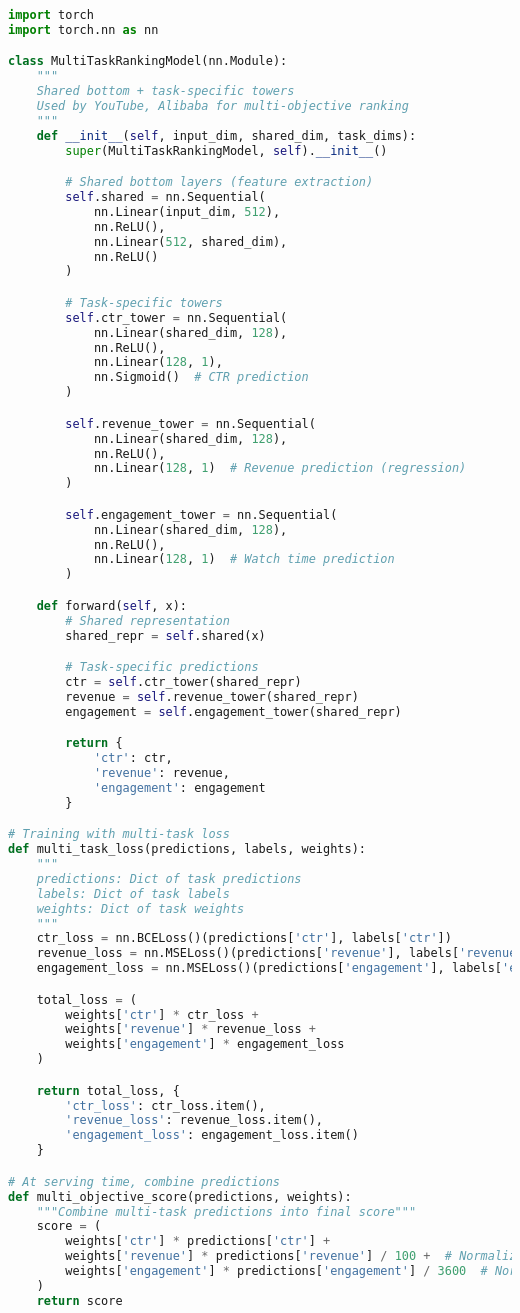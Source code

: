 \documentclass[10pt]{article}
\begin{document}
\begin{lstlisting}[language=Python]
import torch
import torch.nn as nn

class MultiTaskRankingModel(nn.Module):
    """
    Shared bottom + task-specific towers
    Used by YouTube, Alibaba for multi-objective ranking
    """
    def __init__(self, input_dim, shared_dim, task_dims):
        super(MultiTaskRankingModel, self).__init__()

        # Shared bottom layers (feature extraction)
        self.shared = nn.Sequential(
            nn.Linear(input_dim, 512),
            nn.ReLU(),
            nn.Linear(512, shared_dim),
            nn.ReLU()
        )

        # Task-specific towers
        self.ctr_tower = nn.Sequential(
            nn.Linear(shared_dim, 128),
            nn.ReLU(),
            nn.Linear(128, 1),
            nn.Sigmoid()  # CTR prediction
        )

        self.revenue_tower = nn.Sequential(
            nn.Linear(shared_dim, 128),
            nn.ReLU(),
            nn.Linear(128, 1)  # Revenue prediction (regression)
        )

        self.engagement_tower = nn.Sequential(
            nn.Linear(shared_dim, 128),
            nn.ReLU(),
            nn.Linear(128, 1)  # Watch time prediction
        )

    def forward(self, x):
        # Shared representation
        shared_repr = self.shared(x)

        # Task-specific predictions
        ctr = self.ctr_tower(shared_repr)
        revenue = self.revenue_tower(shared_repr)
        engagement = self.engagement_tower(shared_repr)

        return {
            'ctr': ctr,
            'revenue': revenue,
            'engagement': engagement
        }

# Training with multi-task loss
def multi_task_loss(predictions, labels, weights):
    """
    predictions: Dict of task predictions
    labels: Dict of task labels
    weights: Dict of task weights
    """
    ctr_loss = nn.BCELoss()(predictions['ctr'], labels['ctr'])
    revenue_loss = nn.MSELoss()(predictions['revenue'], labels['revenue'])
    engagement_loss = nn.MSELoss()(predictions['engagement'], labels['engagement'])

    total_loss = (
        weights['ctr'] * ctr_loss +
        weights['revenue'] * revenue_loss +
        weights['engagement'] * engagement_loss
    )

    return total_loss, {
        'ctr_loss': ctr_loss.item(),
        'revenue_loss': revenue_loss.item(),
        'engagement_loss': engagement_loss.item()
    }

# At serving time, combine predictions
def multi_objective_score(predictions, weights):
    """Combine multi-task predictions into final score"""
    score = (
        weights['ctr'] * predictions['ctr'] +
        weights['revenue'] * predictions['revenue'] / 100 +  # Normalize
        weights['engagement'] * predictions['engagement'] / 3600  # Normalize
    )
    return score
\end{lstlisting}
\end{document}
